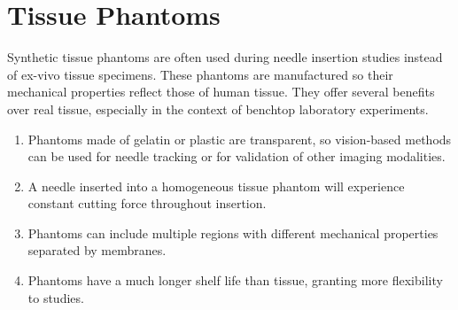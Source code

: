 \section{Tissue Phantoms}
Synthetic tissue phantoms are often used during needle insertion studies instead of ex-vivo tissue specimens. These phantoms are manufactured so their mechanical properties reflect those of human tissue. They offer several benefits over real tissue, especially in the context of benchtop laboratory experiments.
\begin{enumerate}
\item Phantoms made of gelatin or plastic are transparent, so vision-based methods can be used for needle tracking or for validation of other imaging modalities.

\item A needle inserted into a homogeneous tissue phantom will experience constant cutting force throughout insertion.

\item Phantoms can include multiple regions with different mechanical properties separated by membranes.

\item Phantoms have a much longer shelf life than tissue, granting more flexibility to studies.
\end{enumerate}







